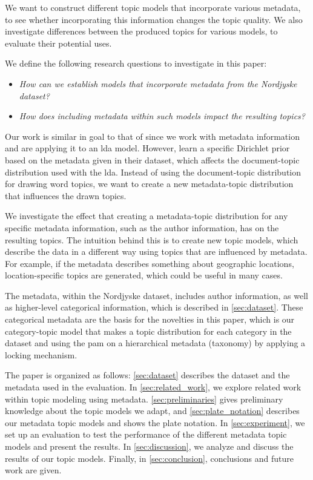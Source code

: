 We want to construct different topic models that incorporate various metadata, to see whether incorporating this information changes the topic quality. 
We also investigate differences between the produced topics for various models, to evaluate their potential uses.

We define the following research questions to investigate in this paper:

\begin{itemize}
	\item \textit{How can we establish models that incorporate metadata from the Nordjyske dataset?}
	\item \textit{How does including metadata within such models impact the resulting topics?}
\end{itemize}

Our work is similar in goal to that of \citet{MetaLDA2017} since we work with metadata information and are applying it to an \gls{lda} model.
However, \citet{MetaLDA2017} learn a specific Dirichlet prior based on the metadata given in their dataset, which affects the document-topic distribution used with the \gls{lda}.
Instead of using the document-topic distribution for drawing word topics, we want to create a new metadata-topic distribution that influences the drawn topics.

We investigate the effect that creating a metadata-topic distribution for any specific metadata information, such as the author information, has on the resulting topics.
The intuition behind this is to create new topic models, which describe the data in a different way using topics that are influenced by metadata.
For example, if the metadata describes something about geographic locations, location-specific topics are generated, which could be useful in many cases.

The metadata, within the Nordjyske dataset, includes author information, as well as higher-level categorical information, which is described in \autoref{sec:dataset}.
These categorical metadata are the basis for the novelties in this paper, which is our category-topic model that makes a topic distribution for each category in the dataset and using the \gls{pam} on a hierarchical metadata (taxonomy) by applying a locking mechanism.

The paper is organized as follows:
\autoref{sec:dataset} describes the dataset and the metadata used in the evaluation.
In \autoref{sec:related_work}, we explore related work within topic modeling using metadata.
\autoref{sec:preliminaries} gives preliminary knowledge about the topic models we adapt, and \autoref{sec:plate_notation} describes our metadata topic models and shows the plate notation.
In \autoref{sec:experiment}, we set up an evaluation to test the performance of the different metadata topic models and present the results.
In \autoref{sec:discussion}, we analyze and discuss the results of our topic models.
Finally, in \autoref{sec:conclusion}, conclusions and future work are given.
